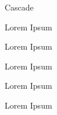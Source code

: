 \begin{titledbox}{Cascade}
    \begin{titledbox}{Lorem Ipsum}
        \lipsum[4]
    \end{titledbox}
    \begin{alertblock}{Lorem Ipsum}
        \lipsum[4]
    \end{alertblock}
    \begin{exampleblock}{Lorem Ipsum}
        \lipsum[4]
    \end{exampleblock}
    \begin{itembox}{Lorem Ipsum}
        \lipsum[4]
    \end{itembox}
    \begin{greenbox}{Lorem Ipsum}
        \lipsum[4]
    \end{greenbox}
\end{titledbox}